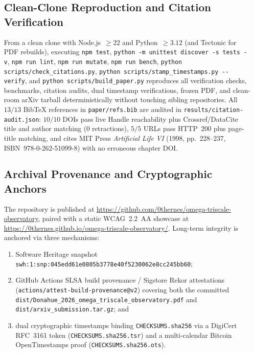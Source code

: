 \documentclass[11pt,reqno]{amsart}
\theoremstyle{definition}
\newcommand{\code}[1]{{\footnotesize\nolinkurl{#1}}}
\begin{document}
\subsection{Clean-Clone Reproduction and Citation Verification}
From a clean clone with Node.js~$\ge 22$ and Python~$\ge 3.12$ (and Tectonic for PDF rebuilds), executing \code{npm test}, \code{python -m unittest discover -s tests -v}, \code{npm run lint}, \code{npm run mutate}, \code{npm run bench}, \code{python scripts/check\_citations.py}, \code{python scripts/stamp\_timestamps.py --verify}, and \code{python scripts/build\_paper.py} reproduces all verification checks, benchmarks, citation audits, dual timestamp verifications, frozen PDF, and clean-room arXiv tarball deterministically without touching sibling repositories. All $13/13$ BibTeX references in \code{paper/refs.bib} are audited in \code{results/citation-audit.json}: $10/10$ DOIs pass live Handle reachability plus Crossref/DataCite title and author matching ($0$ retractions), $5/5$ URLs pass HTTP~200 plus page-title matching, and \cite{bedau1998} cites MIT Press \emph{Artificial Life VI} (1998, pp.~228--237, ISBN~978-0-262-51099-8) with no erroneous chapter DOI.

\subsection{Archival Provenance and Cryptographic Anchors}
The repository is published at \url{https://github.com/0thernes/omega-triscale-observatory}, paired with a static WCAG~2.2~AA showcase at \url{https://0thernes.github.io/omega-triscale-observatory/}. Long-term integrity is anchored via three mechanisms:
\begin{enumerate}[leftmargin=1.5em,itemsep=1pt]
  \item Software Heritage snapshot \code{swh:1:snp:045edd61e0805b3778e40f5230062e8cc245bb60};
  \item GitHub Actions SLSA build provenance / Sigstore Rekor attestations (\code{actions/attest-build-provenance@v2}) covering both the committed \code{dist/Donahue\_2026\_omega\_triscale\_observatory.pdf} and \code{dist/arxiv\_submission.tar.gz}; and
  \item dual cryptographic timestamps binding \code{CHECKSUMS.sha256} via a DigiCert RFC~3161 token (\code{CHECKSUMS.sha256.tsr}) and a multi-calendar Bitcoin OpenTimestamps proof (\code{CHECKSUMS.sha256.ots}).
\end{enumerate}
\end{document}
